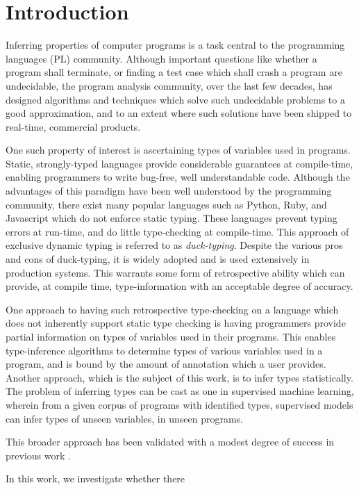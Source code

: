 \section{Introduction}
\label{sec:introduction}
Inferring properties of computer programs is a task central to the programming languages (PL) community. Although important questions like whether a program shall terminate, or finding a test case which shall crash a program are undecidable, the program analysis community, over the last few decades, has designed algorithms and techniques which solve such undecidable problems to a good approximation, and to an extent where such solutions have been shipped to real-time, commercial products. 

One such property of interest is ascertaining types of variables used in programs. Static, strongly-typed languages provide considerable guarantees at compile-time, enabling programmers to write bug-free, well understandable code. Although the advantages of this paradigm have been well understood by the programming community, there exist many popular languages such as Python, Ruby, and Javascript which do not enforce static typing. These languages prevent typing errors at run-time, and do little type-checking at compile-time. This approach of exclusive dynamic typing is referred to as \textit{duck-typing}. Despite the various pros and cons of duck-typing, it is widely adopted and is used extensively in production systems. This warrants some form of retrospective ability which can provide, at compile time, type-information with an acceptable degree of accuracy.

One approach to having such retrospective type-checking on a language which does not inherently support static type checking is having programmers provide partial information on types of variables used in their programs. This enables type-inference algorithms to determine types of various variables used in a program, and is bound by the amount of annotation which a user provides. Another approach, which is the subject of this work, is to infer types statistically. The problem of inferring types can be cast as one in supervised machine learning, wherein from a given corpus of programs with identified types, supervised models can infer types of unseen variables, in unseen programs. 

This broader approach has been validated with a modest degree of success in previous work \cite{}.

In this work, we investigate whether there

